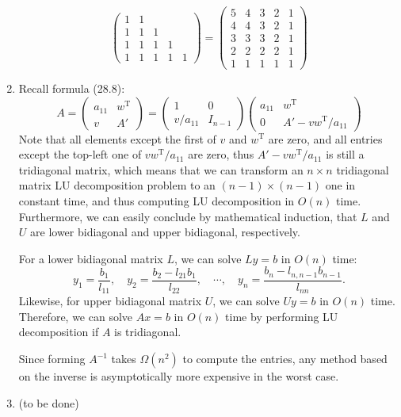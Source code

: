 \documentclass[a4paper,11pt]{article}
\begin{document}
\begin{enumerate}
$$\begin{pmatrix}
            1 & 1 &  &  &  \\
            1 & 1 & 1 &  &  \\
            1 & 1 & 1 & 1 &  \\
            1 & 1 & 1 & 1 & 1
          \end{pmatrix}
          =
          \begin{pmatrix}
            5 & 4 & 3 & 2 & 1 \\
            4 & 4 & 3 & 2 & 1 \\
            3 & 3 & 3 & 2 & 1 \\
            2 & 2 & 2 & 2 & 1 \\
            1 & 1 & 1 & 1 & 1
          \end{pmatrix}$$
      \item Recall formula (28.8):
      $$A = \begin{pmatrix} a_{11} & w^{\text{T}} \\ v & A' \end{pmatrix}
          = \begin{pmatrix} 1 & 0 \\ v/a_{11} & I_{n-1} \end{pmatrix}
          \begin{pmatrix} a_{11} & w^{\text{T}} \\ 0 & A'-vw^{\text{T}}/a_{11} \end{pmatrix}$$
      Note that all elements except the first of $v$ and $w^{\text{T}}$ are zero, and all entries except the top-left one of $vw^{\text{T}}/a_{11}$ are zero, thus $A'-vw^{\text{T}}/a_{11}$ is still a tridiagonal matrix, which means that we can transform an $n \times n$ tridiagonal matrix LU decomposition problem to an $(n-1) \times (n-1)$ one in constant time, and thus computing LU decomposition in $O(n)$ time. Furthermore, we can easily conclude by mathematical induction, that $L$ and $U$ are lower bidiagonal and upper bidiagonal, respectively. \par
      For a lower bidiagonal matrix $L$, we can solve $Ly = b$ in $O(n)$ time:
      $$y_1 = \frac{b_1}{l_{11}},\quad y_2 = \frac{b_2-l_{21}b_1}{l_{22}},\quad \cdots, \quad y_n = \frac{b_n-l_{n, n-1}b_{n-1}}{l_{nn}}.$$
      Likewise, for upper bidiagonal matrix $U$, we can solve $Uy = b$ in $O(n)$ time. Therefore, we can solve $Ax = b$ in $O(n)$ time by performing LU decomposition if $A$ is tridiagonal. \par
      Since forming $A^{-1}$ takes $\Omega(n^2)$ to compute the entries, any method based on the inverse is asymptotically more expensive in the worst case.
    \item (to be done)
  \end{enumerate}
\end{document}
